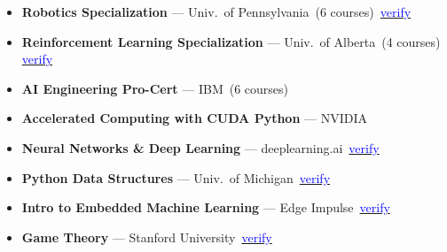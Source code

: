 \documentclass[12pt]{article}
\begin{document}
\begin{itemize} \itemsep -2pt
  \item \textbf{Robotics Specialization} — Univ.\ of Pennsylvania\,
        (6 courses)\,
        \href{https://coursera.org/share/169250f50fb50f44b803162274217f86}{\textcolor{blue}{verify}}
  \item \textbf{Reinforcement Learning Specialization} — Univ.\ of Alberta\,
        (4 courses)\,
        \href{https://www.coursera.org/account/accomplishments/specialization/LWJMD8VB28PZ?utm_source=link&utm_medium=certificate&utm_content=cert_image&utm_campaign=sharing_cta&utm_product=s12n}{\textcolor{blue}{verify}}
  \item \textbf{AI Engineering Pro-Cert} — IBM\,
        (6 courses)
  \item \textbf{Accelerated Computing with CUDA Python} — NVIDIA
  \item \textbf{Neural Networks \& Deep Learning} — deeplearning.ai\,
        \href{https://coursera.org/share/8d9110917e9443857718534087a51190}{\textcolor{blue}{verify}}
  \item \textbf{Python Data Structures} — Univ.\ of Michigan\,
        \href{https://coursera.org/share/8944f2b056a3405c606e509e61f5570e}{\textcolor{blue}{verify}}
  \item \textbf{Intro to Embedded Machine Learning} — Edge Impulse\,
        \href{https://coursera.org/share/0b709e9d6305db689ca5018f1531f4ef}{\textcolor{blue}{verify}}
  \item \textbf{Game Theory} — Stanford University\,
        \href{https://coursera.org/share/7c342a051890483df7748d65ad0113c2}{\textcolor{blue}{verify}}
\end{itemize}



\end{document}
